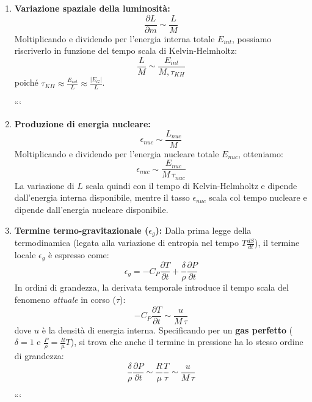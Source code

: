 \begin{enumerate}
\item \textbf{Variazione spaziale della luminosità:}
\begin{equation}
\frac{\partial L}{\partial m} \sim \frac{L}{M}
\end{equation}
Moltiplicando e dividendo per l'energia interna totale $E_{int}$, possiamo riscriverlo in funzione del tempo scala di Kelvin-Helmholtz:
\begin{equation}
\frac{L}{M} \sim \frac{E_{int}}{M , \tau_{KH}}
\end{equation}
poiché $\tau_{KH} \approx \frac{E_{int}}{L} \approx \frac{\vert{}E_G\vert{}}{L}$.

```
\item \textbf{Produzione di energia nucleare:}
\begin{equation}
\epsilon_{nuc} \sim \frac{L_{nuc}}{M}
\end{equation}
Moltiplicando e dividendo per l'energia nucleare totale $E_{nuc}$, otteniamo:
\begin{equation}
\epsilon_{nuc} \sim \frac{E_{nuc}}{M \, \tau_{nuc}}
\end{equation}
La variazione di $L$ scala quindi con il tempo di Kelvin-Helmholtz e dipende dall'energia interna disponibile, mentre il tasso $\epsilon_{nuc}$ scala col tempo nucleare e dipende dall'energia nucleare disponibile.

\item \textbf{Termine termo-gravitazionale ($\epsilon_g$):}
Dalla prima legge della termodinamica (legata alla variazione di entropia nel tempo $T \frac{dS}{dt}$), il termine locale $\epsilon_g$ è espresso come:
\begin{equation}
\epsilon_g = -C_P \frac{\partial T}{\partial t} + \frac{\delta}{\rho} \frac{\partial P}{\partial t}
\end{equation}
In ordini di grandezza, la derivata temporale introduce il tempo scala del fenomeno \textit{attuale} in corso ($\tau$):
\begin{equation}
-C_P \frac{\partial T}{\partial t} \sim \frac{u}{M \, \tau}
\end{equation}
dove $u$ è la densità di energia interna. Specificando per un \textbf{gas perfetto} ($\delta = 1$ e $\frac{P}{\rho} = \frac{R}{\mu} T$), si trova che anche il termine in pressione ha lo stesso ordine di grandezza:
\begin{equation}
\frac{\delta}{\rho} \frac{\partial P}{\partial t} \sim \frac{R}{\mu} \frac{T}{\tau} \sim \frac{u}{M \, \tau}
\end{equation}

```

\end{enumerate}


